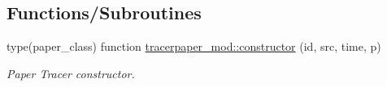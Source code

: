 \subsection*{Functions/\+Subroutines}
\begin{DoxyCompactItemize}
\item 
type(paper\+\_\+class) function \mbox{\hyperlink{namespacetracerpaper__mod_ad1bbc9d4e889b6aab71f0333cf6a5365}{tracerpaper\+\_\+mod\+::constructor}} (id, src, time, p)
\begin{DoxyCompactList}\small\item\em Paper Tracer constructor. \end{DoxyCompactList}\end{DoxyCompactItemize}
